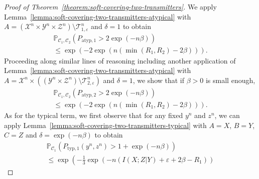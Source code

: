\documentclass[journal]{IEEEtran}
\newcommand{\lemmaconst}{\delta}
\newcommand{\generalrvOne}{A}
\newcommand{\generalrvTwo}{B}
\newcommand{\generalrvThree}{C}
\newcommand{\codebookRateOne}{R_1}
\newcommand{\codebookRateTwo}{R_2}
\newcommand{\channelInOne}{X}
\newcommand{\channelInOneAlph}{\mathcal{X}}
\newcommand{\channelInTwo}{Y}
\newcommand{\channelInTwoAlph}{\mathcal{Y}}
\newcommand{\channelInTwoAlphElement}{y}
\newcommand{\channelOut}{Z}
\newcommand{\channelOutAlph}{\mathcal{Z}}
\newcommand{\channelOutAlphElement}{z}
\newcommand{\alphSubset}{A}
\newcommand{\codebookOne}{\mathcal{C}_1}
\newcommand{\codebookTwo}{\mathcal{C}_2}
\newcommand{\codebookBlocklength}{n}
\newcommand{\mutualInformationConditional}[3]{I(#1;#2|#3)}
\newcommand{\proofconstantOne}{{\beta}}
\newcommand{\Probability}{\mathbb{P}}
\newcommand{\typicalityParam}{\varepsilon}
\newcommand{\typicalSetIndex}[3]{\mathcal{T}_{#3,#1}^{#2}}
\newcommand{\totvarAtypicalOne}{P_{\mathrm{atyp}, 1}}
\newcommand{\totvarAtypicalTwo}{P_{\mathrm{atyp}, 2}}
\newcommand{\totvarTypicalOne}[2]{P_{\mathrm{typ}, 1}({#1},{#2})}
\begin{document}
\begin{proof}[Proof of Theorem~\ref{theorem:soft-covering-two-transmitters}]
We apply Lemma~\ref{lemma:soft-covering-two-transmitters-atypical} with $\alphSubset = (\channelInOneAlph^\codebookBlocklength \times \channelInTwoAlph^\codebookBlocklength \times \channelOutAlph^\codebookBlocklength) \setminus \typicalSetIndex{\typicalityParam}{\codebookBlocklength}{1}$ and $\lemmaconst = 1$ to obtain
\begin{multline}
\label{proof:soft-covering-two-transmitters-atypical-bound-1}
\Probability_{\codebookOne, \codebookTwo}\left(
  \totvarAtypicalOne
  >
  2\exp(-\codebookBlocklength\proofconstantOne)
\right)
\\
\leq
\exp(
  -2\exp(
    \codebookBlocklength(
      \min(\codebookRateOne,\codebookRateTwo) - 2\proofconstantOne
    )
  )
).
\end{multline}
Proceeding along similar lines of reasoning including another application of Lemma~\ref{lemma:soft-covering-two-transmitters-atypical} with $\alphSubset = \channelInOneAlph^\codebookBlocklength \times ((\channelInTwoAlph^\codebookBlocklength \times \channelOutAlph^\codebookBlocklength) \setminus \typicalSetIndex{\typicalityParam}{\codebookBlocklength}{2})$ and $\lemmaconst=1$, we show that if $\proofconstantOne>0$ is small enough,
\begin{multline}
\label{proof:soft-covering-two-transmitters-atypical-bound-2}
\Probability_{\codebookOne, \codebookTwo}\left(
  \totvarAtypicalTwo
  >
  2\exp(-\codebookBlocklength\proofconstantOne)
\right)
\\
\leq
\exp(
  -2\exp(
    \codebookBlocklength(
      \min(\codebookRateOne,\codebookRateTwo) - 2\proofconstantOne
    )
  )
).
\end{multline}
As for the typical term, we first observe that for any fixed $\channelInTwoAlphElement^\codebookBlocklength$ and $\channelOutAlphElement^\codebookBlocklength$, we can apply Lemma~\ref{lemma:soft-covering-two-transmitters-typical} with $\generalrvOne=\channelInOne$, $\generalrvTwo=\channelInTwo$, $\generalrvThree=\channelOut$ and $\lemmaconst=\exp(-\codebookBlocklength\proofconstantOne)$ to obtain
\begin{multline}
\label{proof:soft-covering-two-transmitters-typical-bound}
\Probability_{\codebookOne}\left(
  \totvarTypicalOne{\channelInTwoAlphElement^\codebookBlocklength}{\channelOutAlphElement^\codebookBlocklength}
  >
  1 + \exp(-\codebookBlocklength\proofconstantOne)
\right)
\\
\leq
\exp\left(
  -\frac{1}{3} \exp(-\codebookBlocklength (\mutualInformationConditional{\channelInOne}{\channelOut}{\channelInTwo} + \typicalityParam + 2\proofconstantOne - \codebookRateOne))

\end{multline}
\end{proof}
\end{document}

